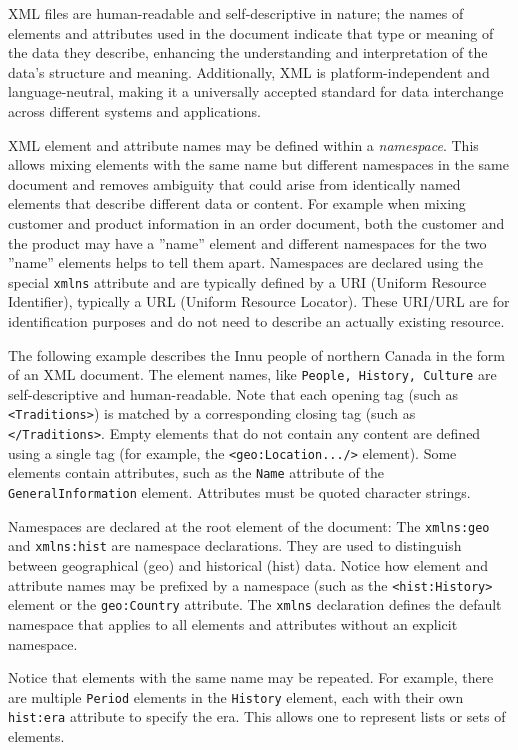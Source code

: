 XML files are human-readable and self-descriptive in nature; the names of elements and attributes used in the document indicate that type or meaning of the data they describe, enhancing the understanding and interpretation of the data's structure and meaning. Additionally, XML is platform-independent and language-neutral, making it a universally accepted standard for data interchange across different systems and applications. 

XML element and attribute names may be defined within a \emph{namespace}. This allows mixing elements with the same name but different namespaces in the same document and removes ambiguity that could arise from identically named elements that describe different data or content. For example when mixing customer and product information in an order document, both the customer and the product may have a ''name'' element and different namespaces for the two ''name'' elements helps to tell them apart. Namespaces are declared using the special \texttt{xmlns} attribute and are typically defined by a URI (Uniform Resource Identifier), typically a URL (Uniform Resource Locator). These URI/URL are for identification purposes and do not need to describe an actually existing resource.

The following example describes the Innu people of northern Canada in the form of an XML document. The element names, like \texttt{People, History, Culture} are self-descriptive and human-readable. Note that each opening tag (such as \texttt{<Traditions>}) is matched by a corresponding closing tag (such as \texttt{</Traditions>}. Empty elements that do not contain any content are defined using a single tag (for example, the \texttt{<geo:Location.../>} element). Some elements contain attributes, such as the \texttt{Name} attribute of the \texttt{GeneralInformation} element. Attributes must be quoted character strings.

Namespaces are declared at the root element of the document: The \texttt{xmlns:geo} and \texttt{xmlns:hist} are namespace declarations. They are used to distinguish between geographical (geo) and historical (hist) data. Notice how element and attribute names may be prefixed by a namespace (such as the \texttt{<hist:History>} element or the \texttt{geo:Country} attribute. The \texttt{xmlns} declaration defines the default namespace that applies to all elements and attributes without an explicit namespace.

Notice that elements with the same name may be repeated. For example, there are multiple \texttt{Period} elements in the \texttt{History} element, each with their own \texttt{hist:era} attribute to specify the era. This allows one to represent lists or sets of elements. 

